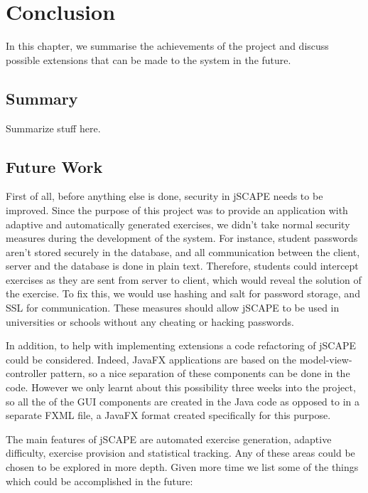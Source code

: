 \chapter{Conclusion}
In this chapter, we summarise the achievements of the project and discuss possible extensions that can be made to the system in the future.

\section{Summary}
Summarize stuff here.

\section{Future Work}
\label{sec:future-work}
First of all, before anything else is done, security in jSCAPE needs to be improved. Since the purpose of this project was to provide an application with adaptive and automatically generated exercises, we didn't take normal security measures during the development of the system. For instance, student passwords aren't stored securely in the database, and all communication between the client, server and the database is done in plain text. Therefore, students could intercept exercises as they are sent from server to client, which would reveal the solution of the exercise. To fix this, we would use hashing and salt for password storage, and SSL for communication. These measures should allow jSCAPE to be used in universities or schools without any cheating or hacking passwords. \newline

In addition, to help with implementing extensions a code refactoring of jSCAPE could be considered. Indeed, \textsf{JavaFX} applications are based on the model-view-controller pattern, so a nice separation of these components can be done in the code. However we only learnt about this possibility three weeks into the project, so all the of the GUI components are created in the Java code as opposed to in a separate \textsf{FXML} file, a \textsf{JavaFX} format created specifically for this purpose.\newline

The main features of jSCAPE are automated exercise generation, adaptive difficulty, exercise provision and statistical tracking. Any of these areas could be chosen to be explored in more depth. Given more time we list some of the things which could be accomplished in the future:

